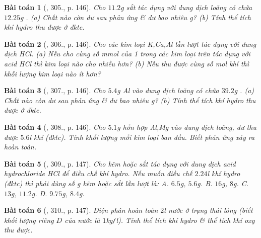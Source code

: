 \documentclass{article}
\newtheorem{baitoan}{Bài toán}
\begin{document}
\begin{baitoan}[\cite{An_400_BT_Hoa_Hoc_8_2020}, 305., p. 146]
	Cho $11.2$\emph{g} sắt tác dụng với dung dịch \emph{} loãng có chứa $12.25$\emph{g }. (a) Chất nào còn dư sau phản ứng \& dư bao nhiêu \emph{g}? (b) Tính thể tích khí hydro thu được ở đktc.
\end{baitoan}

\begin{baitoan}[\cite{An_400_BT_Hoa_Hoc_8_2020}, 306., p. 146]
	Cho các kim loại \emph{K,Ca,Al} lần lượt tác dụng với dung dịch \emph{HCl}. (a) Nếu cho cùng số mmol của 1 trong các kim loại trên tác dụng với acid \emph{HCl} thì kim loại nào cho nhiều \emph{} hơn? (b) Nếu thu được cùng số mol khí \emph{} thì khối lượng kim loại nào ít hơn?
\end{baitoan}

\begin{baitoan}[\cite{An_400_BT_Hoa_Hoc_8_2020}, 307., p. 146]
	Cho $5.4$\emph{g Al} vào dung dịch \emph{} loãng có chứa $39.2$\emph{g }. (a) Chất nào còn dư sau phản ứng \& dư bao nhiêu \emph{g}? (b) Tính thể tích khí hydro thu được ở đktc.
\end{baitoan}

\begin{baitoan}[\cite{An_400_BT_Hoa_Hoc_8_2020}, 308., p. 146]
	Cho $5.1$\emph{g} hỗn hợp \emph{Al,Mg} vào dung dịch \emph{} loãng, dư thu được $5.6$\emph{l} khí \emph{} (đktc). Tính khối lượng mỗi kim loại ban đầu. Biết phản ứng xảy ra hoàn toàn.
\end{baitoan}

\begin{baitoan}[\cite{An_400_BT_Hoa_Hoc_8_2020}, 309., p. 147]
	Cho kẽm hoặc sắt tác dụng với dung dịch acid hydrochloride \emph{HCl} để điều chế khí hydro. Nếu muốn điều chế $2.24$\emph{l} khí hydro (đktc) thì phải dùng số \emph{g} kẽm hoặc sắt lần lượt là: {\sf A.} $6.5$\emph{g}, $5.6$\emph{g}. {\sf B.} $16$\emph{g}, $8$\emph{g}. {\sf C.} $13$\emph{g}, $11.2$\emph{g}. {\sf D.} $9.75$\emph{g}, $8.4$\emph{g}.
\end{baitoan}

\begin{baitoan}[\cite{An_400_BT_Hoa_Hoc_8_2020}, 310., p. 147]
	Điện phân hoàn toàn $2$\emph{l} nước ở trạng thái lỏng (biết khối lượng riêng $D$ của nước là $1$\emph{kg\texttt{/}l}). Tính thể tích khí hydro \& thể tích khí oxy thu được.
\end{baitoan}
\end{document}
